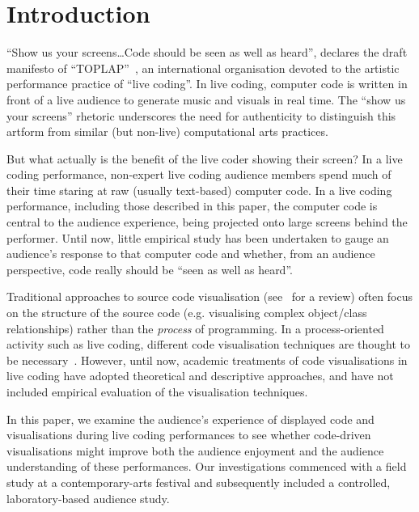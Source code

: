 \documentclass{sig-alternate}
\begin{document}


\section{Introduction}

``Show us your screens\ldots Code should be seen as well as heard'',
declares the draft manifesto of ``TOPLAP''~\cite{Toplap}, an
international organisation devoted to the artistic performance
practice of ``live coding''. In live coding, computer code is written
in front of a live audience to generate music and visuals in real
time. The ``show us your screens'' rhetoric underscores the need for
authenticity to distinguish this artform from similar (but non-live)
computational arts practices.

But what actually is the benefit of the live coder showing their
screen? In a live coding performance, non-expert live coding audience
members spend much of their time staring at raw (usually text-based)
computer code. In a live coding performance, including those described
in this paper, the computer code is central to the audience
experience, being projected onto large screens behind the performer.
Until now, little empirical study has been undertaken to gauge an
audience's response to that computer code and whether, from an
audience perspective, code really should be ``seen as well as heard''.

Traditional approaches to source code visualisation
(see~\cite{Novais2013} for a review) often focus on the structure of
the source code (e.g. visualising complex object/class relationships)
rather than the \emph{process} of programming. In a process-oriented
activity such as live coding, different code visualisation techniques
are thought to be necessary~\cite{McLean2010a,Magnusson2013}.
However, until now, academic treatments of code visualisations in live
coding have adopted theoretical and descriptive approaches, and have
not included empirical evaluation of the visualisation techniques.

In this paper, we examine the audience's experience of displayed code
and visualisations during live coding performances to see whether
code-driven visualisations might improve both the audience enjoyment
and the audience understanding of these performances. Our
investigations commenced with a field study at a contemporary-arts
festival and subsequently included a controlled, laboratory-based
audience study.
\end{document}

